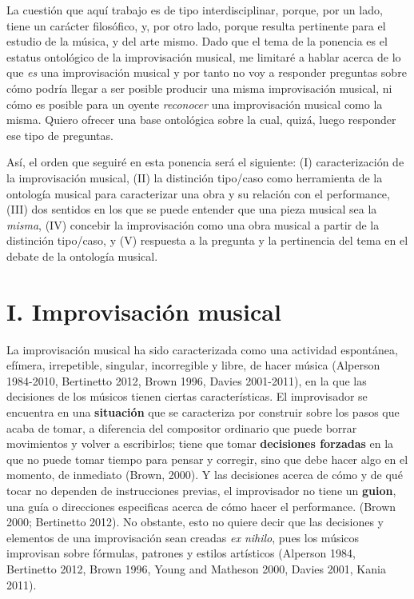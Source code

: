 \documentclass[]{book}
\begin{document}
\begin{refsection}
La cuestión que aquí trabajo es de tipo interdisciplinar, porque, por un
lado, tiene un carácter filosófico, y, por otro lado, porque resulta
pertinente para el estudio de la música, y del arte mismo. Dado que el
tema de la ponencia es el estatus ontológico de la improvisación
musical, me limitaré a hablar acerca de lo que \emph{es} una
improvisación musical y por tanto no voy a responder preguntas sobre
cómo podría llegar a ser posible producir una misma improvisación
musical, ni cómo es posible para un oyente \emph{reconocer} una
improvisación musical como la misma. Quiero ofrecer una base ontológica
sobre la cual, quizá, luego responder ese tipo de preguntas.

Así, el orden que seguiré en esta ponencia será el siguiente: (I)
caracterización de la improvisación musical, (II) la distinción tipo/caso
como herramienta de la ontología musical para caracterizar una obra y su
relación con el performance, (III) dos sentidos en los que se puede
entender que una pieza musical sea la \emph{misma}, (IV) concebir la
improvisación como una obra musical a partir de la distinción tipo/caso,
y (V) respuesta a la pregunta y la pertinencia del tema en el debate de
la ontología musical.

\section*{I. Improvisación musical}


La improvisación musical ha sido caracterizada como una actividad
espontánea, efímera, irrepetible, singular, incorregible y libre, de
hacer música (Alperson 1984-2010, Bertinetto 2012, Brown 1996, Davies
2001-2011), en la que las decisiones de los músicos tienen ciertas
características. El improvisador se encuentra en una \textbf{situación}
que se caracteriza por construir sobre los pasos que acaba de tomar, a
diferencia del compositor ordinario que puede borrar movimientos y
volver a escribirlos; tiene que tomar \textbf{decisiones forzadas} en la
que no puede tomar tiempo para pensar y corregir, sino que debe hacer
algo en el momento, de inmediato (Brown, 2000). Y las decisiones acerca
de cómo y de qué tocar no dependen de instrucciones previas, el
improvisador no tiene un \textbf{guion}, una guía o direcciones
especificas acerca de cómo hacer el performance. (Brown 2000; Bertinetto
2012). No obstante, esto no quiere decir que las decisiones y elementos
de una improvisación sean creadas \emph{ex nihilo}, pues los músicos
improvisan sobre fórmulas, patrones y estilos artísticos (Alperson 1984,
Bertinetto 2012, Brown 1996, Young and Matheson 2000, Davies 2001, Kania
2011).


\end{refsection}
\end{document}
